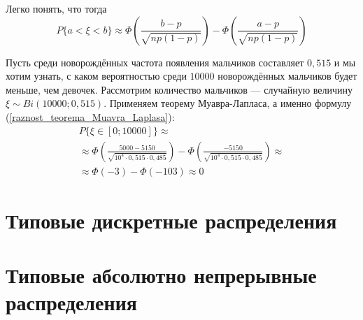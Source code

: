 Легко понять, что тогда
\begin{equation}\label{raznost_teorema_Muavra_Laplasa}
P\{a<\xi<b\} \approx \Phi\left( \frac{b-p}{\sqrt{np(1-p)}} \right) - \Phi\left( \frac{a-p}{\sqrt{np(1-p)}} \right)
\end{equation}

\begin{primer}
Пусть среди новорождённых частота появления мальчиков составляет $0,515$ и мы хотим узнать, с каком вероятностью среди $10000$ новорождённых мальчиков будет меньше, чем девочек.
Рассмотрим количество мальчиков --- случайную величину $\xi \sim Bi(10000; 0,515)$.
Применяем теорему Муавра-Лапласа, а именно формулу (\ref{raznost_teorema_Muavra_Laplasa}):
\begin{multline*}
P\{\xi\in[0; 10000]\} \approx
\\ \approx
\Phi\left( \frac{5000-5150}{\sqrt{10^4 \cdot 0,515 \cdot 0,485 }} \right) - \Phi\left( \frac{-5150}{\sqrt{10^4 \cdot 0,515 \cdot 0,485 }} \right) \approx
\\ \approx
\Phi(-3) - \Phi(-103) \approx 0
\end{multline*}

\end{primer}

\chapter{Типовые дискретные распределения}









\chapter{Типовые абсолютно непрерывные распределения}












